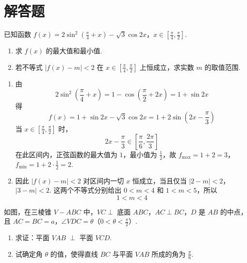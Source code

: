 \section{解答题}

\begin{problem}
已知函数 \(f(x) = 2\sin^2\left(\frac{\pi}{4} + x\right) - \sqrt{3}\cos 2x\)，\(x \in \left[\frac{\pi}{4}, \frac{\pi}{2}\right]\).
\begin{enumerate}
\item 求 \(f(x)\) 的最大值和最小值.
\item 若不等式 \( \left|f(x)-m\right|<2 \) 在 \( x\in\left[\frac{\pi}{4},\frac{\pi}{2}\right] \) 上恒成立，求实数 \(m\) 的取值范围.
\end{enumerate}
\end{problem}

\begin{solution}
\begin{enumerate}
\item
由
\[
2\sin^2\left(\frac{\pi}{4}+x\right)
=1-\cos\left(\frac{\pi}{2}+2x\right)
=1+\sin2x
\]
得
\[
f(x)=1+\sin2x-\sqrt3\cos2x
=1+2\sin\left(2x-\frac{\pi}{3}\right)
\]
当 \(x\in[\frac{\pi}{4},\frac{\pi}{2}]\) 时，
\[
2x-\frac{\pi}{3}\in\left[\frac{\pi}{6},\frac{2\pi}{3}\right]
\]
在此区间内，正弦函数的最大值为 \(1\)，最小值为 \(\frac12\)，故
\(f_{\max}=1+2=3\)，\(f_{\min}=1+2\cdot\frac12=2\).
\item
因此 \(|f(x)-m|<2\) 对区间内一切 \(x\) 恒成立，当且仅当
\(|2-m|<2\)，\(|3-m|<2\).
这两个不等式分别给出 \(0<m<4\) 和 \(1<m<5\)，所以
\[
1<m<4
\]
\end{enumerate}
\end{solution}

\begin{problem}
如图，在三棱锥 \(V - ABC\) 中，\(VC \perp\) 底面 \(ABC\)，\(AC \perp BC\)，\(D\) 是 \(AB\) 的中点，且 \(AC = BC = a\)，\(\angle VDC = \theta\)（\(0 < \theta < \frac{\pi}{2}\)）.

\begin{enumerate}
\item 求证：平面 \(VAB\) \(\perp\) 平面 \(VCD\).
\item 试确定角 \(\theta\) 的值，使得直线 \(BC\) 与平面 \(VAB\) 所成的角为 \(\frac{\pi}{6}\).
\end{enumerate}

\end{problem}

